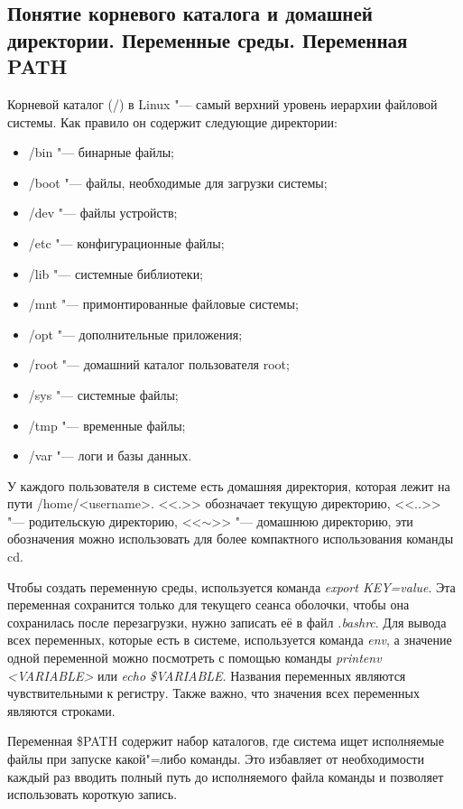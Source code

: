 \documentclass[12pt]{article}
\begin{document}
\subsection{Понятие корневого каталога и домашней директории. Переменные среды. Переменная PATH}
Корневой каталог (/) в Linux "--- самый верхний уровень иерархии файловой системы. Как правило он содержит следующие директории:
\begin{itemize}
\item /bin "--- бинарные файлы;
\item /boot "--- файлы, необходимые для загрузки системы;
\item /dev "--- файлы устройств;
\item /etc "--- конфигурационные файлы;
\item /lib "--- системные библиотеки;
\item /mnt "--- примонтированные файловые системы;
\item /opt "--- дополнительные приложения;
\item /root "--- домашний каталог пользователя root;
\item /sys "--- системные файлы;
\item /tmp "--- временные файлы;
\item /var "--- логи и базы данных.
\end{itemize}

У каждого пользователя в системе есть домашняя директория, которая лежит на пути /home/<username>. <<.>> обозначает текущую директорию, <<..>> "--- родительскую директорию, <<$\sim$>> "--- домашнюю директорию, эти обозначения можно использовать для более компактного использования команды cd.

Чтобы создать переменную среды, используется команда \textit{export KEY=\glqq value\grqq}. Эта переменная сохранится только для текущего сеанса оболочки, чтобы она сохранилась после перезагрузки, нужно записать её в файл \textit{.bashrc}. Для вывода всех переменных, которые есть в системе, используется команда \textit{env}, а значение одной переменной можно посмотреть с помощью команды \textit{printenv <VARIABLE>} или \textit{echo \$VARIABLE}. Названия переменных являются чувствительными к регистру. Также важно, что значения всех переменных являются строками.

Переменная \$PATH содержит набор каталогов, где система ищет исполняемые файлы при запуске какой"=либо команды. Это избавляет от необходимости каждый раз вводить полный путь до исполняемого файла команды и позволяет использовать короткую запись.
\end{document}
